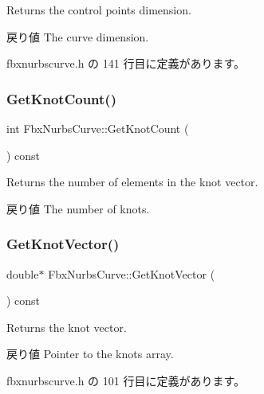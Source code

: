 Returns the control points dimension. \begin{DoxyReturn}{戻り値}
The curve dimension. 
\end{DoxyReturn}


 fbxnurbscurve.\+h の 141 行目に定義があります。

\mbox{\label{class_fbx_nurbs_curve_a6201a71ed5ff2c6a5a467cc78d15c72f}} 
\subsubsection{\texorpdfstring{Get\+Knot\+Count()}{GetKnotCount()}}
{\footnotesize\ttfamily int Fbx\+Nurbs\+Curve\+::\+Get\+Knot\+Count (\begin{DoxyParamCaption}{ }\end{DoxyParamCaption}) const}

Returns the number of elements in the knot vector. \begin{DoxyReturn}{戻り値}
The number of knots. 
\end{DoxyReturn}
\mbox{\label{class_fbx_nurbs_curve_af90ec7ee0a8bc25834d30242afeb9e00}} 
\subsubsection{\texorpdfstring{Get\+Knot\+Vector()}{GetKnotVector()}}
{\footnotesize\ttfamily double$\ast$ Fbx\+Nurbs\+Curve\+::\+Get\+Knot\+Vector (\begin{DoxyParamCaption}{ }\end{DoxyParamCaption}) const\hspace{0.3cm}{\ttfamily [inline]}}

Returns the knot vector. \begin{DoxyReturn}{戻り値}
Pointer to the knots array. 
\end{DoxyReturn}


 fbxnurbscurve.\+h の 101 行目に定義があります。

\mbox{\label{class_fbx_nurbs_curve_a1cbad4f23956e5395916d45b807854f4}} 
